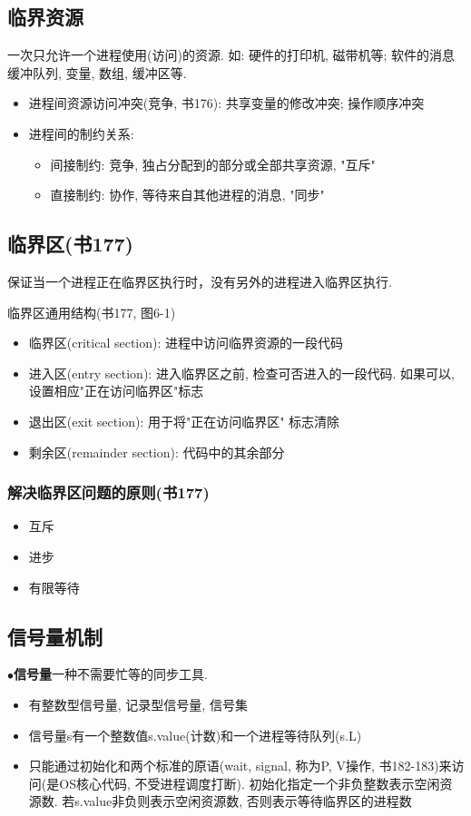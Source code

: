 \documentclass[a4paper, UTF8]{article}
\newcommand{\keypoint}[2]{$\bullet$\textbf{#1}\quad#2\par}
\begin{document}
\subsection{临界资源}
一次只允许一个进程使用(访问)的资源. 如: 硬件的打印机, 磁带机等; 软件的消息缓冲队列, 变量, 数组, 缓冲区等.
\begin{itemize}
\item 进程间资源访问冲突(竞争, 书176): 共享变量的修改冲突; 操作顺序冲突
\item 进程间的制约关系:
	\begin{itemize}
	\item 间接制约: 竞争, 独占分配到的部分或全部共享资源, "互斥"
	\item 直接制约: 协作, 等待来自其他进程的消息, "同步"
	\end{itemize}
\end{itemize}
\subsection{临界区(书177)}
保证当一个进程正在临界区执行时，没有另外的进程进入临界区执行. \par
临界区通用结构(书177, 图6-1)\par
\begin{itemize}
\item 临界区(critical section): 进程中访问临界资源的一段代码
\item 进入区(entry section): 进入临界区之前, 检查可否进入的一段代码. 如果可以, 设置相应"正在访问临界区"标志
\item 退出区(exit section): 用于将"正在访问临界区" 标志清除
\item 剩余区(remainder section): 代码中的其余部分
\end{itemize}
\subsubsection{解决临界区问题的原则(书177)}
\begin{itemize}
\item 互斥
\item 进步
\item 有限等待
\end{itemize}
\subsection{信号量机制}
\keypoint{信号量}{一种不需要忙等的同步工具.}
\begin{itemize}
\item 有整数型信号量, 记录型信号量, 信号集
\item 信号量s有一个整数值s.value(计数)和一个进程等待队列(s.L)
\item 只能通过初始化和两个标准的原语(wait, signal, 称为P, V操作, 书182-183)来访问(是OS核心代码, 不受进程调度打断). 初始化指定一个非负整数表示空闲资源数. 若s.value非负则表示空闲资源数, 否则表示等待临界区的进程数
\end{itemize}
\end{document}
